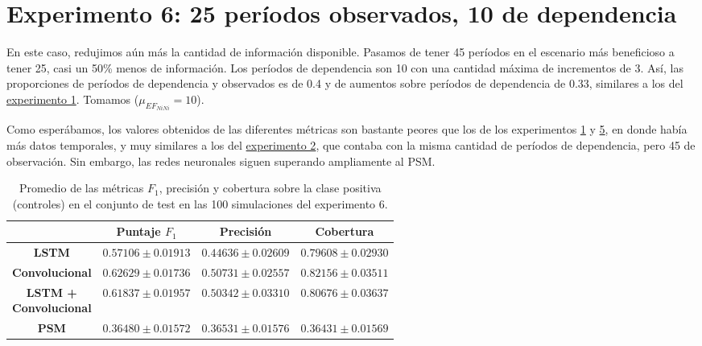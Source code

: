 \documentclass[../../main.tex]{subfiles}
\begin{document}
\section{Experimento 6: 25 períodos observados, 10 de dependencia} \label{sec:exp6} En
este caso, redujimos aún más la cantidad de información disponible. Pasamos de tener 45
períodos en el escenario más beneficioso a tener 25, casi un 50\% menos de información.
Los períodos de dependencia son 10 con una cantidad máxima de incrementos de 3. Así, las
proporciones de períodos de dependencia y observados es de 0.4 y de aumentos sobre
períodos de dependencia de 0.33, similares a los del \hyperref[sec:exp1]{experimento 1}.
Tomamos (\(\mu_{{EF}_{NiNi}} = 10\)).

Como esperábamos, los valores obtenidos de las diferentes métricas son bastante peores que
los de los experimentos \hyperref[sec:exp1]{1} y \hyperref[sec:exp5]{5}, en donde había
más datos temporales, y muy similares a los del \hyperref[sec:exp2]{experimento 2}, que
contaba con la misma cantidad de períodos de dependencia, pero 45 de observación. Sin
embargo, las redes neuronales siguen superando ampliamente al PSM.

\begin{table}[H]
    \centering
    \renewcommand{\arraystretch}{1.2}
    \begin{tabular}{|c|c|c|c|}
        \hline
         & \textbf{Puntaje} \(F_1\) & \textbf{Precisión} & \textbf{Cobertura} \\ \hline\hline
        \textbf{LSTM}
            & $0.57106 \pm 0.01913$ & $0.44636 \pm 0.02609$ & $0.79608 \pm 0.02930$ \\ \hline
        \textbf{Convolucional}
            & $\mathbf{0.62629 \pm 0.01736}$ & $\mathbf{0.50731 \pm 0.02557}$ & $\mathbf{0.82156 \pm 0.03511}$ \\ \hline
        \makecell{\textbf{LSTM +} \\ \textbf{Convolucional}}
            & $0.61837 \pm 0.01957$ & $0.50342 \pm 0.03310$ & $0.80676 \pm 0.03637$ \\ \hline
        \textbf{PSM}
            & $0.36480 \pm 0.01572$ & $0.36531 \pm 0.01576$ & $0.36431 \pm 0.01569$ \\
        \hline
    \end{tabular}
    \caption{Promedio de las métricas \(F_1\), precisión y cobertura sobre la
    clase positiva (controles) en el conjunto de test en las 100 simulaciones del
    experimento 6.}
    \label{tab:results_exp6}
\end{table}
\end{document}
